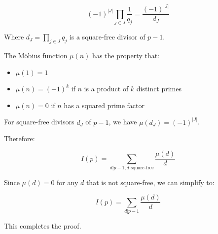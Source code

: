 \documentclass{article}
\begin{document}
$$(-1)^{|J|} \prod_{j \in J} \frac{1}{q_j} = \frac{(-1)^{|J|}}{d_J}$$

Where $d_J = \prod_{j \in J} q_j$ is a square-free divisor of $p-1$.

The Möbius function $\mu(n)$ has the property that:
\begin{itemize}
\item $\mu(1) = 1$
\item $\mu(n) = (-1)^k$ if $n$ is a product of $k$ distinct primes
\item $\mu(n) = 0$ if $n$ has a squared prime factor
\end{itemize}

For square-free divisors $d_J$ of $p-1$, we have $\mu(d_J) = (-1)^{|J|}$.

Therefore:

$$I(p) = \sum_{d|p-1, d \text{ square-free}} \frac{\mu(d)}{d}$$

Since $\mu(d) = 0$ for any $d$ that is not square-free, we can simplify to:

$$I(p) = \sum_{d|p-1} \frac{\mu(d)}{d}$$

This completes the proof.
\end{document}
